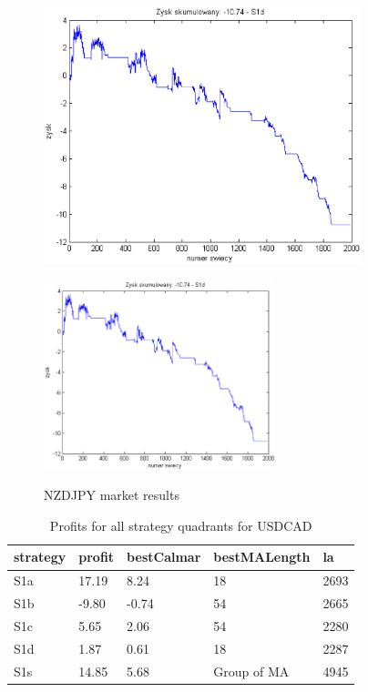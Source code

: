 \documentclass{tewiart}
\begin{document}
\begin{figure}[h]
\begin{minipage}{.49\linewidth}
\label{cztero}
\end{minipage}
\begin{minipage}{.49\linewidth}
\centering
\includegraphics[width=0.82\textwidth]{images/nzdjpyS1d.eps}
\label{mansard}
\end{minipage}
\begin{minipage}{\linewidth}
\centering
\includegraphics[width=0.6\textwidth]{images/nzdjpyS1s.eps}
\label{mansard}
\end{minipage}
\caption{NZDJPY market results}
\end{figure}
\FloatBarrier
\newpage
\begin{table}[!t]
\caption{Profits for all strategy quadrants for USDCAD}
 \begin{center}
 \begin{tabular}{|l|l|l|l|l|}
 \hline \textbf{strategy} & \textbf{profit} & \textbf{bestCalmar} & \textbf{bestMALength} & \textbf{la} \\ \hline
S1a & 17.19 & 8.24 & 18 & 2693\\ \hline
S1b & -9.80 & -0.74 & 54 & 2665\\ \hline
S1c & 5.65 & 2.06 & 54 & 2280\\ \hline
S1d & 1.87 & 0.61 & 18 & 2287\\ \hline
S1s & 14.85 & 5.68 & Group of MA & 4945\\
\hline \end{tabular}
 \end{center}
 \end{table}
\end{document}
